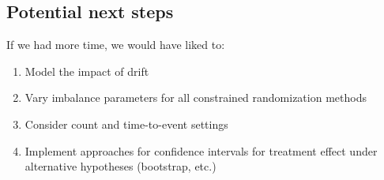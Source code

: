 \subsection{Potential next steps}
If we had more time, we would have liked to:
\begin{enumerate}
	\item Model the impact of drift
	\item Vary imbalance parameters for all constrained randomization methods
	\item Consider count and time-to-event settings
	\item Implement approaches for confidence intervals for treatment effect under alternative hypotheses (bootstrap, etc.)
\end{enumerate}


